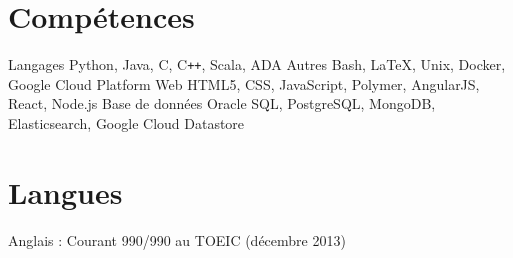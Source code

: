 \documentclass[11pt,a4paper,sans]{moderncv} %
\begin{document}



\section{Compétences}

\cvdoubleitem
    {Langages}
    {Python, Java, C, C\texttt{++}, Scala, ADA}
    {Autres}
    {Bash, \LaTeX, Unix, Docker, Google Cloud Platform}
\cvdoubleitem
    {Web}
    {HTML5, CSS, JavaScript, Polymer, AngularJS, React, Node.js}
    {Base de données}
    {Oracle SQL, PostgreSQL, MongoDB, Elasticsearch, Google Cloud Datastore}

\vspace*{0.5cm}



\section{Langues}

\cvitemwithcomment
    {}
    {Anglais : Courant}
    {990/990 au TOEIC (décembre 2013)}
\end{document}
